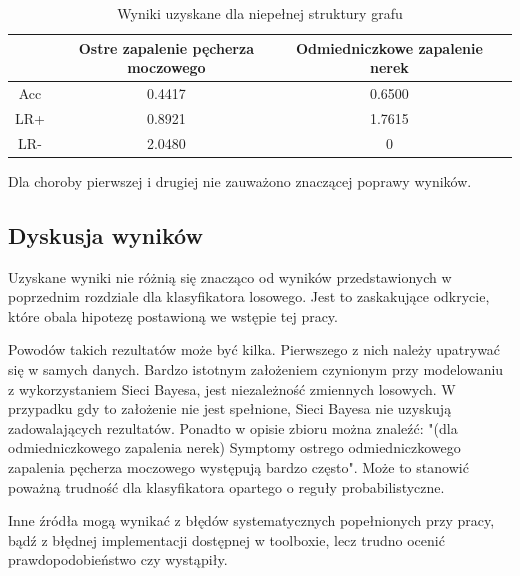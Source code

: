 \documentclass[12pt]{article}
\begin{document}
\begin{table}[H]
\caption{Wyniki uzyskane dla niepełnej struktury grafu}
\label{results not full}
\centering
\begin{tabular}{|c|c|c|c|}
  \hline 
   & Ostre zapalenie pęcherza moczowego & Odmiedniczkowe zapalenie nerek \\
  \hline
  Acc & 0.4417 & 0.6500 \\
  \hline
  LR+ & 0.8921 & 1.7615 \\
  \hline
  LR- & 2.0480 & 0 \\
  \hline
\end{tabular}
\end{table}

Dla choroby pierwszej i drugiej nie zauważono znaczącej poprawy wyników.

\subsection{Dyskusja wyników}

Uzyskane wyniki nie różnią się znacząco od wyników przedstawionych w poprzednim rozdziale dla klasyfikatora losowego. Jest to zaskakujące odkrycie, które obala hipotezę postawioną we wstępie tej pracy. 

Powodów takich rezultatów może być kilka. Pierwszego z nich należy upatrywać się w samych danych. Bardzo istotnym założeniem czynionym przy modelowaniu z wykorzystaniem Sieci Bayesa, jest niezależność zmiennych losowych. W przypadku gdy to założenie nie jest spełnione, Sieci Bayesa nie uzyskują zadowalających rezultatów. Ponadto w opisie zbioru można znaleźć: "(dla odmiedniczkowego zapalenia nerek) Symptomy ostrego odmiedniczkowego zapalenia pęcherza moczowego występują bardzo często". Może to stanowić poważną trudność dla klasyfikatora opartego o reguły probabilistyczne. 

Inne źródła mogą wynikać z błędów systematycznych popełnionych przy pracy, bądź z błędnej implementacji dostępnej w toolboxie, lecz trudno ocenić prawdopodobieństwo czy wystąpiły.
\end{document}
